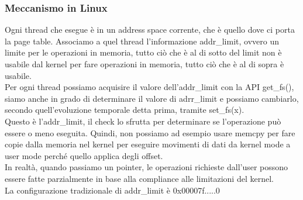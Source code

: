 \documentclass[12pt, oneside]{extbook}
\begin{document}
\subsubsection{Meccanismo in Linux}
Ogni thread che esegue è in un address space corrente, che è quello dove ci porta la page table. Associamo a quel thread l'informazione \textsf{addr\_limit}, ovvero un limite per le operazioni in memoria, tutto ciò che è al di sotto del limit non è usabile dal kernel per fare operazioni in memoria, tutto ciò che è al di sopra è usabile.\\Per ogni thread possiamo acquisire il valore dell'addr\_limit con la API \textsf{get\_fs()}, siamo anche in grado di determinare il valore di adrr\_limit e possiamo cambiarlo, secondo quell'evoluzione temporale detta prima, tramite \textsf{set\_fs(x)}.\\Questo è l'addr\_limit, il check lo sfrutta per determinare se l'operazione può essere o meno eseguita. Quindi, non possiamo ad esempio usare memcpy per fare copie dalla memoria nel kernel per eseguire movimenti di dati da kernel mode a user mode perché quello applica degli offset.\\In realtà, quando passiamo un pointer, le operazioni richieste dall'user possono essere fatte parzialmente in base alla compliance alle limitazioni del kernel.\\La configurazione tradizionale di addr\_limit è \textsf{0x00007f.....0}
\end{document}
